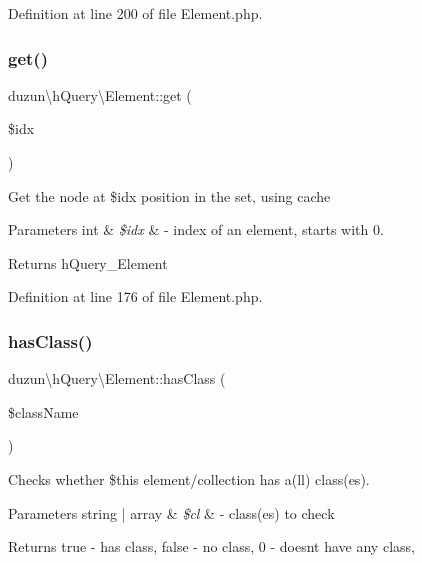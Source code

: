Definition at line 200 of file Element.\+php.

\mbox{\label{classduzun_1_1hQuery_1_1Element_aa629dd31a0d9ced799f65e4bd7c0b0f3}} 
\subsubsection{\texorpdfstring{get()}{get()}}
{\footnotesize\ttfamily duzun\textbackslash{}h\+Query\textbackslash{}\+Element\+::get (\begin{DoxyParamCaption}\item[{}]{\$idx }\end{DoxyParamCaption})}

Get the node at \$idx position in the set, using cache


\begin{DoxyParams}[1]{Parameters}
int & {\em \$idx} & -\/ index of an element, starts with 0.\\
\hline
\end{DoxyParams}
\begin{DoxyReturn}{Returns}
h\+Query\+\_\+\+Element 
\end{DoxyReturn}


Definition at line 176 of file Element.\+php.

\mbox{\label{classduzun_1_1hQuery_1_1Element_a0791de5ec50b8d91dacca06ee2074364}} 
\subsubsection{\texorpdfstring{has\+Class()}{hasClass()}}
{\footnotesize\ttfamily duzun\textbackslash{}h\+Query\textbackslash{}\+Element\+::has\+Class (\begin{DoxyParamCaption}\item[{}]{\$class\+Name }\end{DoxyParamCaption})}

Checks whether \$this element/collection has a(ll) class(es).


\begin{DoxyParams}[1]{Parameters}
string | array & {\em \$cl} & -\/ class(es) to check \\
\hline
\end{DoxyParams}
\begin{DoxyReturn}{Returns}
true -\/ has class, false -\/ no class, 0 -\/ doesn\textquotesingle{}t have any class, 
\end{DoxyReturn}


